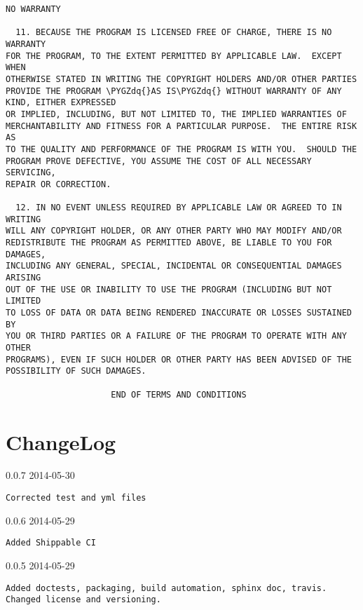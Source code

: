 \documentclass[letterpaper,10pt,english]{sphinxmanual}
\def\PYGZdq{\char`\"}
\begin{document}
\begin{Verbatim}[commandchars=\\\{\}]
                            NO WARRANTY

  11. BECAUSE THE PROGRAM IS LICENSED FREE OF CHARGE, THERE IS NO WARRANTY
FOR THE PROGRAM, TO THE EXTENT PERMITTED BY APPLICABLE LAW.  EXCEPT WHEN
OTHERWISE STATED IN WRITING THE COPYRIGHT HOLDERS AND/OR OTHER PARTIES
PROVIDE THE PROGRAM \PYGZdq{}AS IS\PYGZdq{} WITHOUT WARRANTY OF ANY KIND, EITHER EXPRESSED
OR IMPLIED, INCLUDING, BUT NOT LIMITED TO, THE IMPLIED WARRANTIES OF
MERCHANTABILITY AND FITNESS FOR A PARTICULAR PURPOSE.  THE ENTIRE RISK AS
TO THE QUALITY AND PERFORMANCE OF THE PROGRAM IS WITH YOU.  SHOULD THE
PROGRAM PROVE DEFECTIVE, YOU ASSUME THE COST OF ALL NECESSARY SERVICING,
REPAIR OR CORRECTION.

  12. IN NO EVENT UNLESS REQUIRED BY APPLICABLE LAW OR AGREED TO IN WRITING
WILL ANY COPYRIGHT HOLDER, OR ANY OTHER PARTY WHO MAY MODIFY AND/OR
REDISTRIBUTE THE PROGRAM AS PERMITTED ABOVE, BE LIABLE TO YOU FOR DAMAGES,
INCLUDING ANY GENERAL, SPECIAL, INCIDENTAL OR CONSEQUENTIAL DAMAGES ARISING
OUT OF THE USE OR INABILITY TO USE THE PROGRAM (INCLUDING BUT NOT LIMITED
TO LOSS OF DATA OR DATA BEING RENDERED INACCURATE OR LOSSES SUSTAINED BY
YOU OR THIRD PARTIES OR A FAILURE OF THE PROGRAM TO OPERATE WITH ANY OTHER
PROGRAMS), EVEN IF SUCH HOLDER OR OTHER PARTY HAS BEEN ADVISED OF THE
POSSIBILITY OF SUCH DAMAGES.

                     END OF TERMS AND CONDITIONS
\end{Verbatim}


\chapter{ChangeLog}
\label{changelog::doc}\label{changelog:changelog}
0.0.7 2014-05-30

\begin{Verbatim}[commandchars=\\\{\}]
Corrected test and yml files
\end{Verbatim}

0.0.6 2014-05-29

\begin{Verbatim}[commandchars=\\\{\}]
Added Shippable CI
\end{Verbatim}

0.0.5 2014-05-29

\begin{Verbatim}[commandchars=\\\{\}]
Added doctests, packaging, build automation, sphinx doc, travis.
Changed license and versioning.
\end{Verbatim}
\end{document}
